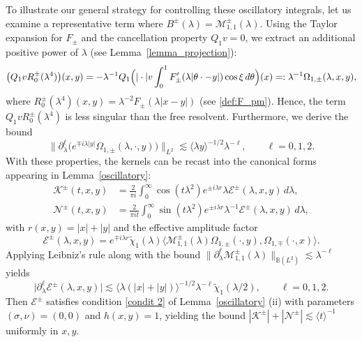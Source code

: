 \documentclass[reqno]{amsart}
\numberwithin{equation}{section}
\begin{document}
To illustrate our general strategy for controlling these oscillatory integrals, let us examine a representative term where $B^\pm(\lambda)=\mathcal{M}_{1,1}^{\pm}(\lambda)$.
Using the Taylor expansion for $F_\pm$ and the cancellation property $Q_1 v = 0$, we extract an additional positive power of $\lambda$ (see Lemma~\ref{lemma_projection}):
$$
\bigl(Q_1 v R_0^\pm(\lambda^4)\bigr)(x,y)
= -\lambda^{-1} Q_1\Bigl(|\cdot| v \int_0^1 F_\pm'(\lambda|\theta\cdot-y|)\cos\xi\,d\theta\Bigr)(x)
=: \lambda^{-1} \Omega_{1,\pm}(\lambda,x,y),
$$
where $R^\pm_0(\lambda^4)(x,y)=\lambda^{-2}F_\pm(\lambda|x-y|)$ (see \eqref{def:F_pm}). Hence, the term $Q_1 v R_0^\pm(\lambda^4)$ is less singular than the free resolvent. Furthermore, we derive the  bound
\[
\bigl\|\partial_\lambda^\ell\bigl(e^{\mp i\lambda|y|} \Omega_{1,\pm}(\lambda,\cdot,y)\bigr)\bigr\|_{L^2}
\lesssim \langle \lambda y\rangle^{-1/2} \lambda^{-\ell}, \qquad \ell=0,1,2.
\]
With these properties, the kernels can be recast into the canonical forms appearing in Lemma~\ref{oscillatory}:
\begin{align*}
	\mathcal{K}^\pm(t,x,y) &= \frac{2}{\pi i}\int_0^{\infty} \cos (t \lambda^2)e^{\pm i\lambda r} \lambda \mathcal{E}^\pm(\lambda, x,y) \, d\lambda, \\
	\mathcal{N}^\pm(t,x,y) &= \frac{2}{\pi i t}\int_0^{\infty} \sin(t\lambda^2) e^{\pm i\lambda r} \lambda^{-1} \mathcal{E}^\pm(\lambda, x,y) \, d\lambda,
\end{align*}
with  $r(x,y) = |x| + |y|$ and the effective amplitude factor $$\mathcal{E}^\pm(\lambda,x,y) = e^{\mp i\lambda r} \widetilde{\chi}_1(\lambda) \langle \mathcal{M}_{1,1}^{\pm}(\lambda) \Omega_{1,\pm}(\cdot, y), \Omega_{1,\mp}(\cdot, x) \rangle.$$ Applying Leibniz's rule along with the bound $\|\partial_\lambda^{\ell} \mathcal{M}_{1,1}^{\pm}(\lambda)\|_{\mathbb{B}(L^2)}\lesssim\lambda^{-\ell}$ yields
\[
\bigl|\partial_\lambda^{\ell} \mathcal{E}^\pm(\lambda,x,y) \bigr| \lesssim \bigl\langle \lambda (|x|+|y|)\bigr\rangle^{-1/2} \lambda^{-\ell} \widetilde{\chi}_1(\lambda/2),  \qquad  \ell=0,1,2.
\]
Then $\mathcal{E}^\pm$ satisfies condition \eqref{condit 2} of Lemma~\ref{oscillatory} (ii) with parameters $(\sigma, \nu)=(0,0)$ and $ h(x,y)=1$, yielding  the bound $|\mathcal{K}^\pm|+|\mathcal{N}^\pm |\lesssim \langle t \rangle^{-1}$ uniformly in $x, y$.
\end{document}
